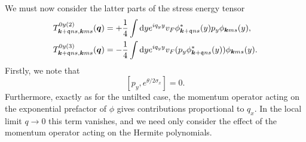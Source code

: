 We must now consider the latter parts of the stress energy tensor
\begin{align}
  T_{\bm{k} + \mathfrak{q} ns, \bm{k} ms}^{0y (2)} (\bm{q}) &=
                                                             + \frac{1}{4} \int \mathrm{d} y
                                                             e^{iq_{y} y} v_{F}
                                                             \phi ^{*}_{\bm{k}+\mathfrak{q} ns} (y) p_{y} \phi _{\bm{k} m s} (y),\\
  T_{\bm{k} + \mathfrak{q} ns, \bm{k} ms}^{0y (3)} (\bm{q}) &=
                                                             - \frac{1}{4} \int \mathrm{d} y
                                                             e^{iq_{y} y} v_{F}
                                                             (p_{y} \phi ^{*}_{\bm{k}+\mathfrak{q} ns} (y))  \phi _{\bm{k} m s} (y).
\end{align}
Firstly, we note that
\[
  [p_{y} , e^{\theta /2 \sigma _{x}}] = 0.
\]
Furthermore, exactly as for the untilted case, the momentum operator acting on the exponential prefactor of \(\phi \) gives contributions proportional to \(q_{x}\).
In the local limit \(q\to  0\) this term vanishes, and we need only consider the effect of the momentum operator acting on the Hermite polynomials.

